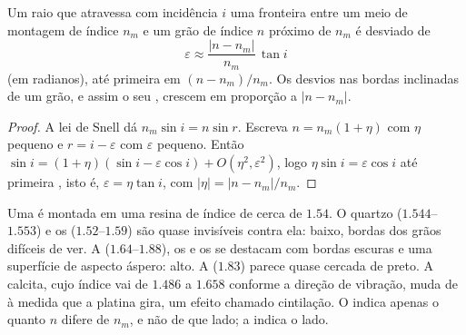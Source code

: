 \begin{proposition}\label{prop:b1:optical-mineralogy:relief}
Um raio que atravessa com incidência $i$ uma fronteira entre um meio de montagem de índice
$n_m$ e um grão de índice $n$ próximo de $n_m$ é desviado de
\[
  \varepsilon \approx \frac{|n - n_m|}{n_m}\,\tan i
\]
(em radianos), até primeira  em $(n - n_m)/n_m$. Os desvios nas bordas inclinadas de um grão, e assim o seu , crescem em proporção a
$|n - n_m|$.
\end{proposition}

\begin{proof}
A lei de Snell dá $n_m \sin i = n \sin r$. Escreva $n = n_m(1 + \eta)$ com
$\eta$ pequeno e $r = i - \varepsilon$ com $\varepsilon$ pequeno. Então
$\sin i = (1 + \eta)(\sin i - \varepsilon\cos i) + O(\eta^2, \varepsilon^2)$,
logo $\eta \sin i = \varepsilon\cos i$ até primeira , isto é,
$\varepsilon = \eta\tan i$, com $|\eta| = |n - n_m|/n_m$.
\end{proof}

Uma  é montada em uma resina de índice de cerca de $1.54$.
O quartzo ($1.544$--$1.553$) e os  ($1.52$--$1.59$) são quase invisíveis contra ela:  baixo, bordas dos grãos difíceis de ver. A  ($1.64$--$1.88$), os  e os  se destacam com bordas escuras e uma superfície de aspecto áspero:  alto. A  ($1.83$) parece quase cercada de preto. A calcita, cujo índice vai de $1.486$ a $1.658$ conforme a direção de vibração, muda de  à medida que a platina gira, um efeito chamado cintilação.
O  indica apenas o quanto $n$ difere de $n_m$, e não de que lado; a  indica o lado.

